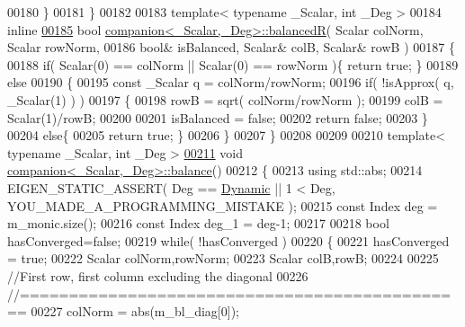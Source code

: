 \begin{DoxyCode}
00180   \}
00181 \}
00182 
00183 \textcolor{keyword}{template}< \textcolor{keyword}{typename} \_Scalar, \textcolor{keywordtype}{int} \_Deg >
00184 \textcolor{keyword}{inline}
\hyperlink{class_eigen_1_1internal_1_1companion_a9945fcaca89aecc2fbff0e9b06510de0}{00185} \textcolor{keywordtype}{bool} \hyperlink{class_eigen_1_1internal_1_1companion_a9945fcaca89aecc2fbff0e9b06510de0}{companion<\_Scalar,\_Deg>::balancedR}( Scalar colNorm, Scalar rowNorm,
00186     \textcolor{keywordtype}{bool}& isBalanced, Scalar& colB, Scalar& rowB )
00187 \{
00188   \textcolor{keywordflow}{if}( Scalar(0) == colNorm || Scalar(0) == rowNorm )\{ \textcolor{keywordflow}{return} \textcolor{keyword}{true}; \}
00189   \textcolor{keywordflow}{else}
00190   \{
00195     \textcolor{keyword}{const} \_Scalar q = colNorm/rowNorm;
00196     \textcolor{keywordflow}{if}( !isApprox( q, \_Scalar(1) ) )
00197     \{
00198       rowB = sqrt( colNorm/rowNorm );
00199       colB = Scalar(1)/rowB;
00200 
00201       isBalanced = \textcolor{keyword}{false};
00202       \textcolor{keywordflow}{return} \textcolor{keyword}{false};
00203     \}
00204     \textcolor{keywordflow}{else}\{
00205       \textcolor{keywordflow}{return} \textcolor{keyword}{true}; \}
00206   \}
00207 \}
00208 
00209 
00210 \textcolor{keyword}{template}< \textcolor{keyword}{typename} \_Scalar, \textcolor{keywordtype}{int} \_Deg >
\hyperlink{class_eigen_1_1internal_1_1companion_a7362d054f04f6d554fb6c8a279287000}{00211} \textcolor{keywordtype}{void} \hyperlink{class_eigen_1_1internal_1_1companion_a7362d054f04f6d554fb6c8a279287000}{companion<\_Scalar,\_Deg>::balance}()
00212 \{
00213   \textcolor{keyword}{using} std::abs;
00214   EIGEN\_STATIC\_ASSERT( Deg == \hyperlink{namespace_eigen_ad81fa7195215a0ce30017dfac309f0b2}{Dynamic} || 1 < Deg, YOU\_MADE\_A\_PROGRAMMING\_MISTAKE );
00215   \textcolor{keyword}{const} Index deg   = m\_monic.size();
00216   \textcolor{keyword}{const} Index deg\_1 = deg-1;
00217 
00218   \textcolor{keywordtype}{bool} hasConverged=\textcolor{keyword}{false};
00219   \textcolor{keywordflow}{while}( !hasConverged )
00220   \{
00221     hasConverged = \textcolor{keyword}{true};
00222     Scalar colNorm,rowNorm;
00223     Scalar colB,rowB;
00224 
00225     \textcolor{comment}{//First row, first column excluding the diagonal}
00226     \textcolor{comment}{//==============================================}
00227     colNorm = abs(m\_bl\_diag[0]);

\end{DoxyCode}
